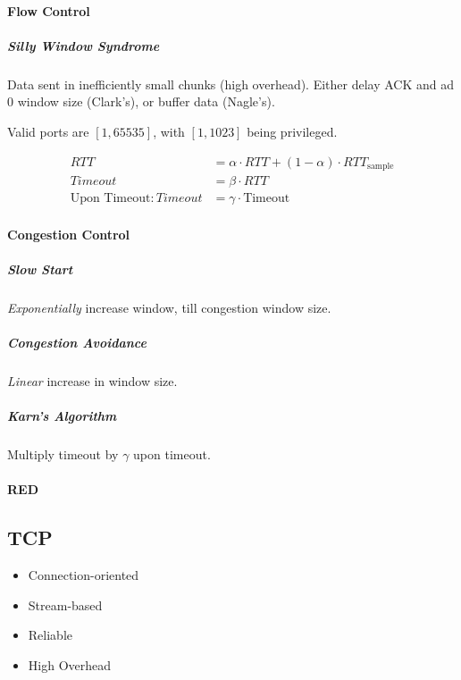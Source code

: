 \documentclass[10pt]{extarticle}
\begin{document}
\begin{multicols}{2}
\begin{multicols*}{2}
    \paragraph*{Flow Control}
    \small
    \subparagraph*{Silly Window Syndrome} Data sent in inefficiently small chunks
    (high overhead). Either delay ACK and ad 0 window size (Clark's), or buffer data (Nagle's).
  \end{multicols*}

  \vspace*{-0.5em}
  Valid ports are \([1, 65535]\), with \([1, 1023]\) being privileged.

  \vspace*{-2em}

  \begin{align*}
    RTT                           & = \alpha \cdot RTT + (1 - \alpha) \cdot RTT_{\text{sample}} \\
    Timeout                       & = \beta \cdot RTT                                           \\
    \text{Upon Timeout} : Timeout & = \gamma \cdot \text{Timeout}
  \end{align*}


  \paragraph*{Congestion Control}
  \subparagraph*{Slow Start} \emph{Exponentially} increase window, till
  congestion window size.
  \subparagraph*{Congestion Avoidance} \emph{Linear} increase in window size.
  \subparagraph*{Karn's Algorithm} Multiply timeout by \(\gamma\) upon timeout.

  \paragraph*{RED}

  \columnbreak

  \vspace*{-5em}

  \begin{multicols}{2}
    \subsection*{TCP}
    \begin{itemize}
      \item Connection-oriented
      \item Stream-based
      \item Reliable
      \item High Overhead
    \end{itemize}


\end{multicols}
\end{multicols}
\end{document}
